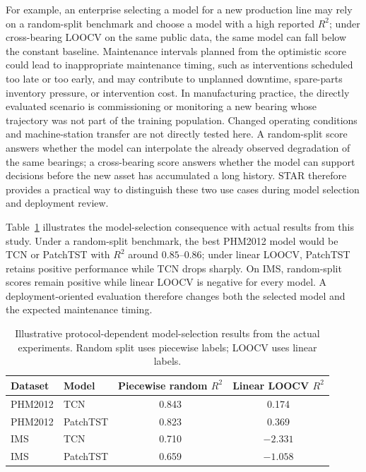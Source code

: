 \documentclass[pdflatex,sn-mathphys-num]{sn-jnl}
\begin{document}
For example, an enterprise selecting a model for a new production line may rely on a random-split benchmark and choose a model with a high reported $R^2$; under cross-bearing LOOCV on the same public data, the same model can fall below the constant baseline. Maintenance intervals planned from the optimistic score could lead to inappropriate maintenance timing, such as interventions scheduled too late or too early, and may contribute to unplanned downtime, spare-parts inventory pressure, or intervention cost. In manufacturing practice, the directly evaluated scenario is commissioning or monitoring a new bearing whose trajectory was not part of the training population. Changed operating conditions and machine-station transfer are not directly tested here. A random-split score answers whether the model can interpolate the already observed degradation of the same bearings; a cross-bearing score answers whether the model can support decisions before the new asset has accumulated a long history. STAR therefore provides a practical way to distinguish these two use cases during model selection and deployment review.

Table~\ref{tab:deployment_selection} illustrates the model-selection consequence with actual results from this study. Under a random-split benchmark, the best PHM2012 model would be TCN or PatchTST with $R^2$ around $0.85$--$0.86$; under linear LOOCV, PatchTST retains positive performance while TCN drops sharply. On IMS, random-split scores remain positive while linear LOOCV is negative for every model. A deployment-oriented evaluation therefore changes both the selected model and the expected maintenance timing.


\begin{table}[t]
\centering
\caption{Illustrative protocol-dependent model-selection results from the actual experiments. Random split uses piecewise labels; LOOCV uses linear labels.}
\label{tab:deployment_selection}
\small
\begin{tabular}{llcc}
\toprule
Dataset & Model & Piecewise random $R^2$ & Linear LOOCV $R^2$ \\
\midrule
PHM2012 & TCN & 0.843 & 0.174 \\
PHM2012 & PatchTST & 0.823 & 0.369 \\
IMS & TCN & 0.710 & $-2.331$ \\
IMS & PatchTST & 0.659 & $-1.058$ \\
\bottomrule
\end{tabular}
\end{table}
\end{document}
